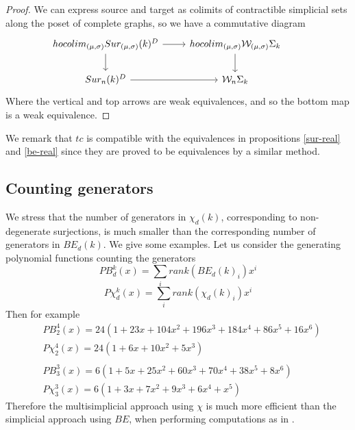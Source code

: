 \begin{proof}
	We can express source and target as colimits of contractible %
	simplicial sets along the poset of complete graphs,
	so we have a commutative diagram
	\begin{equation*}
		\begin{tikzcd}
			hocolim_{(\mu,\sigma)}Sur_{(\mu,\sigma)}(k)^{D} \arrow[r] \arrow[d]& hocolim_{(\mu,\sigma)}\mathcal{W}_{(\mu,\sigma)}\Sigma_{k} \arrow[d] \\
			Sur_{n}(k)^{D}\arrow[r] & \mathcal{W}_{n}\Sigma_{k}&
		\end{tikzcd}
	\end{equation*}
	Where the vertical and top arrows
	are weak equivalences, and so the bottom map is a weak equivalence.
\end{proof}
We remark that $tc$ is compatible with the equivalences in propositions \ref{sur-real} and \ref{be-real} since they are proved to be equivalences by a similar method.





\subsection{Counting  generators}

We stress that the number of generators in $\chi_d(k)$, corresponding to non-degenerate surjections,
is much smaller than the corresponding number of generators in $BE_d(k)$.
We give some examples.
Let us consider the generating polynomial functions counting the generators
$$PB_d^k(x) = \sum_i rank(BE_d(k)_i) x^i $$ $$P\chi_d^k(x)=
\sum_i rank(\chi_d(k)_i) x^i$$
Then for example
\begin{align*}
	& PB_2^4(x)=24(1+23x+104x^2+196x^3+184x^4+86x^5+16x^6)\\
	& P\chi_2^4(x)=24(1+6x+10x^2+5x^3) \\
	& \\
	& PB_3^3(x) = 6(1+5x+25x^2+60x^3+70x^4+38x^5+8x^6 ) \\
	&  P\chi_3^3(x)= 6(1+3x+7x^2+9x^3+6x^4+x^5)
\end{align*}
Therefore the multisimplicial approach using $\chi$ is much more efficient than the simplicial
approach using $BE$, when performing computations as in \cite{formality}.

